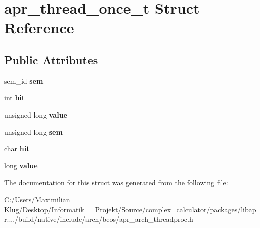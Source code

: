 \hypertarget{structapr__thread__once__t}{}\section{apr\+\_\+thread\+\_\+once\+\_\+t Struct Reference}
\label{structapr__thread__once__t}
\subsection*{Public Attributes}
\begin{DoxyCompactItemize}
\item 
\mbox{\label{structapr__thread__once__t_a80b936e6b09a6bf1982b04722dc7d0b8}} 
sem\+\_\+id {\bfseries sem}
\item 
\mbox{\label{structapr__thread__once__t_ad9a780dfa21e9b99b2bf2f1a15d9bb20}} 
int {\bfseries hit}
\item 
\mbox{\label{structapr__thread__once__t_a2e82419ef57c194d5755d931613a84f5}} 
unsigned long {\bfseries value}
\item 
\mbox{\label{structapr__thread__once__t_a78826694bc3f7c2c67d0953bdee43b18}} 
unsigned long {\bfseries sem}
\item 
\mbox{\label{structapr__thread__once__t_a370725fd6d5b1f0a0e40f9b138987a1e}} 
char {\bfseries hit}
\item 
\mbox{\label{structapr__thread__once__t_a8f46eac53eac5140df3a44962507da69}} 
long {\bfseries value}
\end{DoxyCompactItemize}


The documentation for this struct was generated from the following file\+:\begin{DoxyCompactItemize}
\item 
C\+:/\+Users/\+Maximilian Klug/\+Desktop/\+Informatik\+\_\+\_\+\+Projekt/\+Source/complex\+\_\+calculator/packages/libapr..../build/native/include/arch/beos/apr\+\_\+arch\+\_\+threadproc.\+h\end{DoxyCompactItemize}
